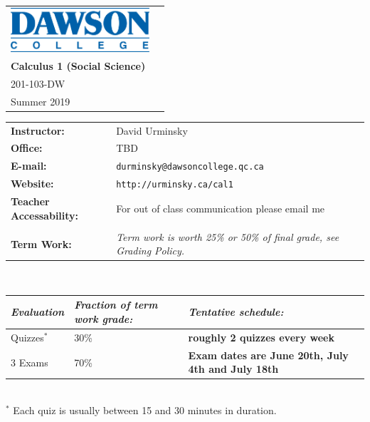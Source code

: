 \documentclass[12pt]{article}
\begin{document}
\begin{tabular*}{8in}{@{}p{4.75in}r}
\includegraphics[height=0.65in]{dawson-college-blue.png} &
\raisebox{0.5cm}{
\begin{tabular}{r}
\large\textbf{Mathematics Department}\\
\large\textbf{Calculus 1 {\sc (Social Science)}}\\
\large 201-103-DW \\
\large Summer 2019
\end{tabular}}
\end{tabular*}

\vspace{0.5in}

\normalsize
\begin{tabular}{@{}p{2in}p{5.25in}}
\textbf{Instructor:} & David Urminsky\\
\textbf{Office:} & TBD\\
\textbf{E-mail:} & \verb+durminsky@dawsoncollege.qc.ca+\\
\textbf{Website:} & \verb+http://urminsky.ca/cal1+\\
\textbf{Teacher Accessability:} & For out of class communication please email me\\\\
\textbf{Term Work:}&\textit{Term work is worth 25\% or 50\% of final grade, see Grading Policy.}\\
\end{tabular}\\
\begin{tabular}{l|p{2in}|p{4.15in}}
\textit{Evaluation} & \textit{Fraction of term work grade:} & \textit{Tentative schedule:}\\
\hline
Quizzes$^{*}$ & 30\% & \textbf{roughly 2 quizzes every week}\\
3 Exams & 70\% & \textbf{Exam dates are June 20th, July 4th and July 18th}\\
\end{tabular}\\
$^{*}$ Each quiz is usually between 15 and 30 minutes in duration.\\
\end{document}
